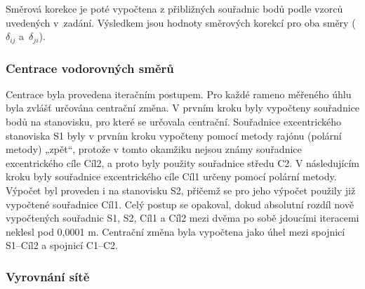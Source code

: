Směrová korekce je poté vypočtena z přibližných souřadnic bodů podle vzorců uvedených v~zadání. Výsledkem jsou hodnoty směrových korekcí pro oba směry ($\delta_{ij}$ a~$\delta_{ji}$).


\subsubsection{Centrace vodorovných směrů}



\tab Centrace byla provedena iteračním postupem. Pro každé rameno měřeného úhlu byla zvlášť určována centrační změna. V prvním kroku byly vypočteny souřadnice bodů na stanovisku, pro které se určovala centrační. Souřadnice excentrického stanoviska S1 byly v prvním kroku vypočteny pomocí metody rajónu (polární metody) „zpět“, protože v tomto okamžiku nejsou známy souřadnice excentrického cíle Cíl2, a proto byly použity souřadnice středu C2. V následujícím kroku byly souřadnice excentrického cíle Cíl1 určeny pomocí polární metody. Výpočet byl proveden i na stanovisku S2, přičemž se pro jeho výpočet použily již vypočtené souřadnice Cíl1. Celý postup se opakoval, dokud absolutní rozdíl nově vypočtených souřadnic S1, S2, Cíl1 a Cíl2 mezi dvěma po sobě jdoucími iteracemi neklesl pod 0,0001 m. Centrační změna byla vypočtena jako úhel mezi spojnicí S1–Cíl2 a spojnicí C1–C2.

\subsubsection{Vyrovnání sítě}
